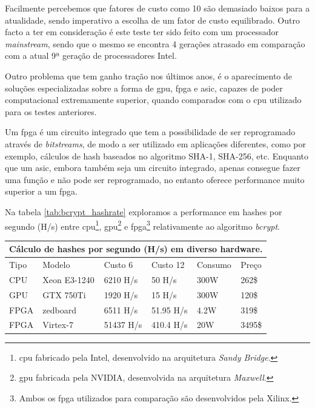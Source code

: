 Facilmente percebemos que fatores de custo como 10 são demasiado baixos para a atualidade, sendo imperativo a escolha de um fator de custo equilibrado. Outro facto a ter em consideração é este teste ter sido feito com um processador \emph{mainstream}, sendo que o mesmo se encontra 4 gerações atrasado em comparação com a atual 9ª geração de processadores Intel.

Outro problema que tem ganho tração nos últimos anos, é o aparecimento de soluções especializadas sobre a forma de \gls{gpu}, \gls{fpga}\cite{wiemer2014high}\cite{malvoni2014your} e \gls{asic}, capazes de poder computacional extremamente superior, quando comparados com o \gls{cpu} utilizado para os testes anteriores.

Um \gls{fpga} é um circuito integrado que tem a possibilidade de ser reprogramado através de \emph{bitstreams}, de modo a ser utilizado em aplicações diferentes, como por exemplo, cálculos de hash baseados no algoritmo SHA-1, SHA-256, etc. Enquanto que um \gls{asic}, embora também seja um circuito integrado, apenas consegue fazer uma função e não pode ser reprogramado, no entanto oferece performance muito superior a um \gls{fpga}.

Na tabela \ref{tab:bcrypt_hashrate} exploramos a performance em hashes por segundo (H/s) entre \gls{cpu}\footnote{\gls{cpu} fabricado pela Intel, desenvolvido na arquitetura \emph{Sandy Bridge}.}, \gls{gpu}\footnote{\gls{gpu} fabricada pela NVIDIA, desenvolvida na arquitetura \emph{Maxwell}.} e \gls{fpga}\footnote{Ambos os \gls{fpga} utilizados para comparação são desenvolvidos pela Xilinx.} relativamente ao algoritmo \emph{bcrypt}.

\begin{center}
    \begin{tabular}{ |p{1cm}|p{2.5cm}|p{2cm}|p{2cm}|p{1.75cm}|p{0.9cm}|  }
        \hline
        \multicolumn{6}{|c|}{Cálculo de hashes por segundo (H/s) em diverso hardware.} \\
        \hline
        Tipo & Modelo & Custo 6 & Custo 12 & Consumo & Preço\\
        \hline
        CPU & Xeon E3-1240 & 6210 H/s & 50 H/s& 300W & 262\$\\
        GPU & GTX 750Ti & 1920 H/s& 15 H/s& 300W & 120\$\\
        FPGA & zedboard & 6511 H/s & 51.95 H/s& 4.2W & 319\$\\
        FPGA & Virtex-7 & 51437 H/s& 410.4 H/s& 20W & 3495\$\\
        \hline
    \end{tabular}
\label{tab:bcrypt_hashrate} 
\end{center}

